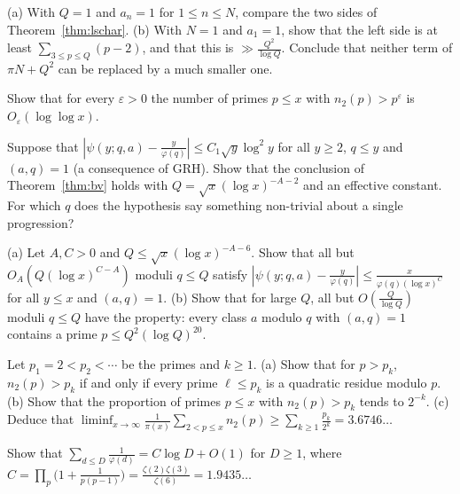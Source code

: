 \begin{exercise}[$\star$]\label{ex:lssharp}
(a) With $Q=1$ and $a_n=1$ for $1\le n\le N$, compare the two sides of Theorem~\ref{thm:lschar}. (b) With $N=1$ and $a_1=1$, show that the left side is at least $\sum_{3\le p\le Q}(p-2)$, and that this is $\gg\frac{Q^2}{\log Q}$. Conclude that neither term of $\pi N+Q^2$ can be replaced by a much smaller one.
\end{exercise}

\begin{exercise}[$\star$]\label{ex:linnikll}
Show that for every $\varepsilon>0$ the number of primes $p\le x$ with $n_2(p)>p^\varepsilon$ is $O_\varepsilon(\log\log x)$.
\end{exercise}

\begin{exercise}[$\star$]\label{ex:grhbv}
Suppose that $|\psi(y;q,a)-\frac y{\varphi(q)}|\le C_1\sqrt y\log^2y$ for all $y\ge2$, $q\le y$ and $(a,q)=1$ (a consequence of GRH). Show that the conclusion of Theorem~\ref{thm:bv} holds with $Q=\sqrt x(\log x)^{-A-2}$ and an effective constant. For which $q$ does the hypothesis say something non-trivial about a single progression?
\end{exercise}

\begin{exercise}[$\star\star$]\label{ex:goodmoduli}
(a) Let $A,C>0$ and $Q\le\sqrt x(\log x)^{-A-6}$. Show that all but $O_{A}(Q(\log x)^{C-A})$ moduli $q\le Q$ satisfy $|\psi(y;q,a)-\frac y{\varphi(q)}|\le\frac x{\varphi(q)(\log x)^C}$ for all $y\le x$ and $(a,q)=1$.
(b) Show that for large $Q$, all but $O(\frac Q{\log Q})$ moduli $q\le Q$ have the property: every class $a$ modulo $q$ with $(a,q)=1$ contains a prime $p\le Q^2(\log Q)^{20}$.
\end{exercise}

\begin{exercise}[$\star\star$]\label{ex:erdosn2}
Let $p_1=2<p_2<\cdots$ be the primes and $k\ge1$.
(a) Show that for $p>p_k$, $n_2(p)>p_k$ if and only if every prime $\ell\le p_k$ is a quadratic residue modulo $p$.
(b) Show that the proportion of primes $p\le x$ with $n_2(p)>p_k$ tends to $2^{-k}$.
(c) Deduce that $\liminf_{x\to\infty}\frac1{\pi(x)}\sum_{2<p\le x}n_2(p)\ge\sum_{k\ge1}\frac{p_k}{2^k}=3.6746\ldots$
\end{exercise}

\begin{exercise}[$\star\star$]\label{ex:phisum}
Show that $\sum_{d\le D}\frac1{\varphi(d)}=C\log D+O(1)$ for $D\ge1$, where
$C=\prod_p\bigl(1+\frac1{p(p-1)}\bigr)=\frac{\zeta(2)\zeta(3)}{\zeta(6)}=1.9435\ldots$
\end{exercise}

